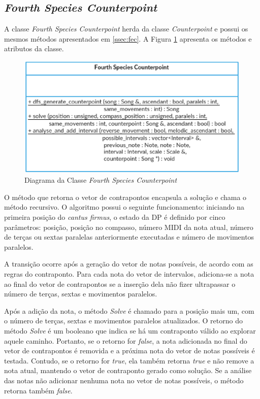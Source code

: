    \subsection[\textit{Fourth Species Counterpoint}]{\textit{Fourth Species Counterpoint}}

    A classe \textit{Fourth Species Counterpoint} herda da classe \textit{Counterpoint} e possui os mesmos métodos apresentados em \ref{ssec:fec}. A Figura \ref{fourthspeciescounterpointclass} apresenta os métodos e atributos da classe.

    \begin{figure}[htb]
      \centering
      \includegraphics[scale=0.7]{figuras/fourthspeciescounterpointclass.eps}
      \caption{Diagrama da Classe \textit{Fourth Species Counterpoint}}
      \label{fourthspeciescounterpointclass}
    \end{figure}

    O método que retorna o vetor de contrapontos encapsula a solução e chama o método recursivo. O algoritmo possui o seguinte funcionamento: iniciando na primeira posição do \textit{cantus firmus}, o estado da DP é definido por cinco parâmetros: posição, posição no compasso, número MIDI da nota atual, número de terças ou sextas paralelas anteriormente executadas e número de movimentos paralelos.

    A transição ocorre após a geração do vetor de notas possíveis, de acordo com as regras do contraponto. Para cada nota do vetor de intervalos, adiciona-se a nota ao final do vetor de contrapontos se a inserção dela não fizer ultrapassar o número de terças, sextas e movimentos paralelos.

    Após a adição da nota, o método \textit{Solve} é chamado para a posição mais um, com o número de terças, sextas e movimentos paralelos atualizados. O retorno do método \textit{Solve} é um booleano que indica se há um contraponto válido ao explorar aquele caminho. Portanto, se o retorno for \textit{false}, a nota adicionada no final do vetor de contrapontos é removida e a próxima nota do vetor de notas possíveis é testada. Contudo, se o retorno for \textit{true}, ela também retorna \textit{true} e não remove a nota atual, mantendo o vetor de contraponto gerado como solução. Se a análise das notas não adicionar nenhuma nota no vetor de notas possíveis, o método retorna também \textit{false}.


